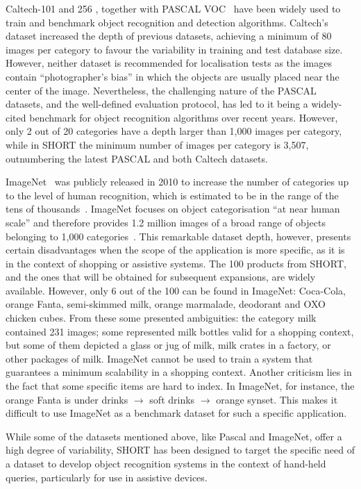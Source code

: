 Caltech-101 and 256 \cite{Feifei2007,Griffin2007}, together with PASCAL VOC~\cite{Everingham2009} have been widely used to train and benchmark object recognition and detection algorithms. Caltech's dataset increased the depth of previous datasets, achieving a minimum of 80 images per category to favour the variability in training and test database size. However, neither dataset is recommended for localisation tests as the images contain ``photographer's bias'' in which the objects are usually placed near the center of the image. Nevertheless, the challenging nature of the PASCAL datasets, and the well-defined evaluation protocol, has led to it being a widely-cited benchmark for object recognition algorithms over recent years. However, only 2 out of 20 categories have a depth larger than 1,000 images per category, while in SHORT the minimum number of images per category is 3,507, outnumbering the latest PASCAL and both Caltech datasets.
 
ImageNet~\cite{Deng2009} was publicly released in 2010 to increase the number of categories up to the level of human recognition, which is estimated to be in the range of the tens of thousands~\cite{Biederman1987}. ImageNet focuses on object categorisation ``at near human scale'' and therefore provides 1.2 million images of a broad range of objects belonging to 1,000 categories~\cite{Feifei2007}. This remarkable dataset depth, however, presents certain disadvantages when the scope of the application is more specific, as it is in the context of shopping or assistive systems. The 100 products from SHORT, and the ones that will be obtained for subsequent expansions, are widely available. However, only 6 out of the 100 can be found in ImageNet: Coca-Cola, orange Fanta, semi-skimmed milk, orange marmalade, deodorant and OXO chicken cubes. From these some presented ambiguities: the category milk contained 231 images; some represented milk bottles valid for a shopping context, but some of them depicted a glass or jug of milk, milk crates in a factory, or other packages of milk. ImageNet cannot be used to train a system that guarantees a minimum scalability in a shopping context. Another criticism lies in the fact that some specific items are hard to index. In ImageNet, for instance, the orange Fanta is under drinks $\rightarrow$ soft drinks $\rightarrow$ orange synset. This makes it difficult to use ImageNet as a benchmark dataset for such a specific application.


While some of the datasets mentioned above, like Pascal and ImageNet, offer a high degree of variability, SHORT has been designed to target the specific need of a dataset to develop object recognition systems in the context of hand-held queries, particularly for use in assistive devices.

